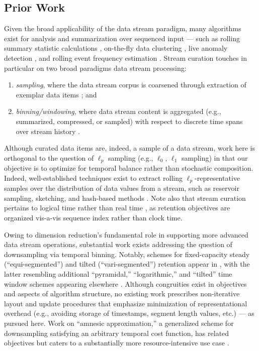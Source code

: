 \subsection{Prior Work}
\label{sec:prior-work}

Given the broad applicability of the data stream paradigm, many algorithms exist for analysis and summarization over sequenced input --- such as rolling summary statistic calculations \citep{lin2004continuously}, on-the-fly data clustering \citep{silva2013data}, live anomaly detection \citep{cai2004maids}, and rolling event frequency estimation \citep{manku2002approximate}.
Stream curation touches in particular on two broad paradigms data stream processing:
\begin{enumerate}
\item \textit{sampling}, where the data stream corpus is coarsened through extraction of exemplar data items \citep{sibai2016sampling}; and
\item \textit{binning/windowing}, where data stream content is aggregated (e.g., summarized, compressed, or sampled) with respect to discrete time spans over stream history \citep{gama2007data}.
\end{enumerate}

Although curated data items are, indeed, a sample of a data stream, work here is orthogonal to the question of $\ell_p$ sampling (e.g., $\ell_0$, $\ell_1$ sampling) in that our objective is to optimize for temporal balance rather than stochastic composition.
Indeed, well-established techniques exist to extract rolling $\ell_p$-representative samples over the distribution of data values from a stream, such as reservoir sampling, sketching, and hash-based methods \citep{gaber2005mining,muthukrishnan2005data,cormode2019lp}.
Note also that stream curation pertains to logical time rather than real time \citep{sibai2016sampling}, as retention objectives are organized vis-a-vis sequence index rather than clock time.

Owing to dimension reduction's fundamental role in supporting more advanced data stream operations, substantial work exists addressing the question of downsampling via temporal binning.
Notably, schemes for fixed-capacity steady (``equi-segmented'') and tilted (``vari-segmented'') retention appear in \citep{zhao2005generalized}, with the latter resembling additional ``pyramidal,'' ``logarithmic,'' and ``tilted'' time window schemes appearing elsewhere \citep{aggarwal2003framework,han2005stream,giannella2003mining,phithakkitnukoon2010recent}.
Although congruities exist in objectives and aspects of algorithm structure, no existing work prescribes non-iterative layout and update procedures that emphasize minimization of representational overhead (e.g., avoiding storage of timestamps, segment length values, etc.) --- as pursued here.
Work on ``amnesic approximation,'' a generalized scheme for downsampling satisfying an arbitrary temporal cost function, has related objectives but caters to a substantially more resource-intensive use case \citep{palpanas2004online}.

